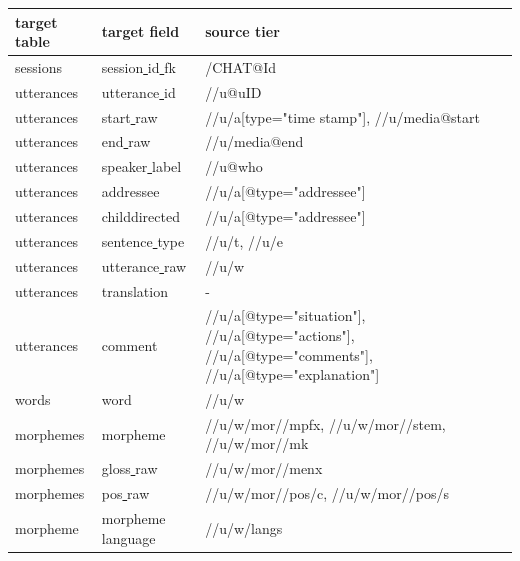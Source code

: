 \documentclass[a4paper, 11pt]{book}
\newcommand{\und}{\underline{{ }}\hspace{0.2mm}}	%
\begin{document}
\begin{table}[ht!]
	\centering
	\begin{tabular}{lll}
		\toprule
			\textbf{target table} & \textbf{target field} & \textbf{source tier} \\
		\midrule
			sessions 	& session\und id\und fk 	& /CHAT@Id \\
			utterances 	& utterance\und id	& //u@uID \\
			utterances 	& start\und raw		& //u/a[type="time stamp"], //u/media@start \\
			utterances 	& end\und raw		& //u/media@end \\
			utterances 	& speaker\und label	& //u@who \\
			utterances 	& addressee			& //u/a[@type="addressee"] \\
			utterances 	& childdirected		& //u/a[@type="addressee"] \\
			utterances 	& sentence\und type	& //u/t, //u/e \\
			utterances 	& utterance\und raw	& //u/w \\ %
			utterances 	& translation		& - \\
			utterances 	& comment			& //u/a[@type="situation"], //u/a[@type="actions"], //u/a[@type="comments"], //u/a[@type="explanation"] \\

			words	 	& word		& //u/w \\
			morphemes	& morpheme			& //u/w/mor//mpfx, //u/w/mor//stem, //u/w/mor//mk \\ %
			morphemes	& gloss\und raw		& //u/w/mor//menx \\ %
			morphemes	& pos\und raw		& //u/w/mor//pos/c, //u/w/mor//pos/s \\ %
			morpheme	& morpheme\und language			& //u/w/langs \\


\end{tabular}
\end{table}
\end{document}

